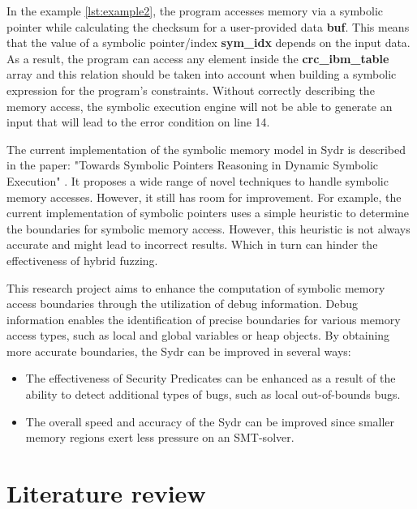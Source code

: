 \documentclass[conference]{IEEEtran}
\begin{document}
In the example \ref{lst:example2}, the program accesses memory via a symbolic pointer while calculating the checksum for a user-provided data \textbf{buf}. This means that the value of a symbolic pointer/index \textbf{sym\_idx} depends on the input data. As a result, the program can access any element inside the \textbf{crc\_ibm\_table} array and this relation should be taken into account when building a symbolic expression for the program's constraints. Without correctly describing the memory access, the symbolic execution engine will not be able to generate an input that will lead to the error condition on line 14.

The current implementation of the symbolic memory model in Sydr is described in the paper: "Towards Symbolic Pointers Reasoning in Dynamic Symbolic Execution" \cite{symbolic-pointers-reasoning}. It proposes a wide range of novel techniques to handle symbolic memory accesses. However, it still has room for improvement. For example, the current implementation of symbolic pointers uses a simple heuristic to determine the boundaries for symbolic memory access. However, this heuristic is not always accurate and might lead to incorrect results. Which in turn can hinder the effectiveness of hybrid fuzzing.

This research project aims to enhance the computation of symbolic memory access boundaries through the utilization of debug information. Debug information enables the identification of precise boundaries for various memory access types, such as local and global variables or heap objects. By obtaining more accurate boundaries, the Sydr can be improved in several ways:

\begin{itemize}
    \item The effectiveness of Security Predicates can be enhanced as a result of the ability to detect additional types of bugs, such as local out-of-bounds bugs.
    \item The overall speed and accuracy of the Sydr can be improved since smaller memory regions exert less pressure on an SMT-solver.
\end{itemize}



\section{Literature review}
\end{document}
